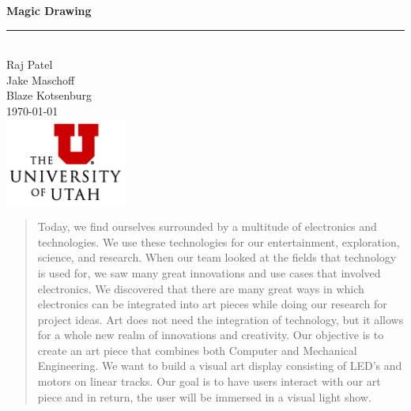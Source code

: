 \documentclass[11pt]{IEEEtran}
\begin{document}
\begin{titlepage}

  \newcommand{\HRule}{\rule{\linewidth}{0.5mm}} %
  
  \vspace*{\fill}
  \center %
  
  { \huge \bfseries Magic Drawing}\\
  \HRule \\[1cm]

  \large Raj Patel\\
  \large Jake Maschoff\\
  \large Blaze Kotsenburg\\[2cm]

  
  \normalsize \today\\[4cm]
  
  \includegraphics[width=0.30\textwidth]{logo.png}
  \vspace*{\fill}
  
\end{titlepage}

\begin{abstract}
  
  Today, we find ourselves surrounded by a multitude of electronics and technologies. We use these technologies for our entertainment, exploration, science, and research. When our team looked at the fields that technology is used for, we saw many great innovations and use cases that involved electronics. We discovered that there are many great ways in which electronics can be integrated into art pieces while doing our research for project ideas. Art does not need the integration of technology, but it allows for a whole new realm of innovations and creativity. Our objective is to create an art piece that combines both Computer and Mechanical Engineering. We want to build a visual art display consisting of LED’s and motors on linear tracks. Our goal is to have users interact with our art piece and in return, the user will be immersed in a visual light show.
\end{abstract}
\end{document}
